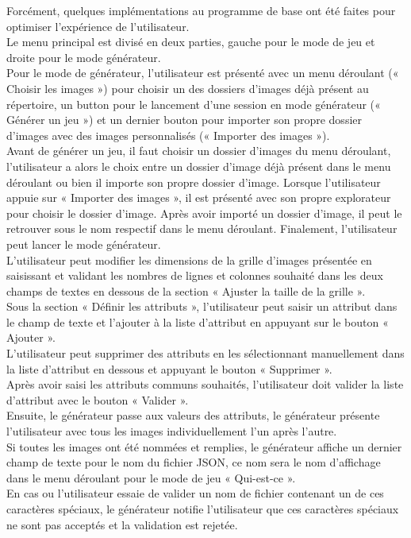 \documentclass[a4paper]{article}
\begin{document}
Forcément, quelques implémentations au programme de base ont été faites pour optimiser l’expérience de l’utilisateur.\\
Le menu principal est divisé en deux parties, gauche pour le mode de jeu et droite pour le mode générateur.\\
Pour le mode de générateur, l’utilisateur est présenté avec un menu déroulant (« Choisir les images ») pour choisir un des dossiers d’images déjà présent au répertoire, un button pour le lancement d’une session en mode générateur (« Générer un jeu ») et un dernier bouton pour importer son propre dossier d’images avec des images personnalisés (« Importer des images »).\\
Avant de générer un jeu, il faut choisir un dossier d’images du menu déroulant, l’utilisateur a alors le choix entre un dossier d’image déjà présent dans le menu déroulant ou bien il importe son propre dossier d’image. Lorsque l’utilisateur appuie sur « Importer des images », il est présenté avec son propre explorateur pour choisir le dossier d’image. Après avoir importé un dossier d’image, il peut le retrouver sous le nom respectif dans le menu déroulant. Finalement, l'utilisateur peut lancer le mode générateur.\\
L’utilisateur peut modifier les dimensions de la grille d’images présentée en saisissant et validant les nombres de lignes et colonnes souhaité dans les deux champs de textes en dessous de la section « Ajuster la taille de la grille ».\\
Sous la section « Définir les attributs », l’utilisateur peut saisir un attribut dans le champ de texte et l’ajouter à la liste d’attribut en appuyant sur le bouton « Ajouter ».\\
L’utilisateur peut supprimer des attributs en les sélectionnant manuellement dans la liste d’attribut en dessous et appuyant le bouton « Supprimer ».\\
Après avoir saisi les attributs communs souhaités, l’utilisateur doit valider la liste d’attribut avec le bouton « Valider ».\\
Ensuite, le générateur passe aux valeurs des attributs, le générateur présente l’utilisateur avec tous les images individuellement l’un après l’autre.\\
Si toutes les images ont été nommées et remplies, le générateur affiche un dernier champ de texte pour le nom du fichier JSON, ce nom sera le nom d’affichage dans le menu déroulant pour le mode de jeu « Qui-est-ce ».\\
En cas ou l’utilisateur essaie de valider un nom de fichier contenant un de ces caractères spéciaux, le générateur notifie l’utilisateur que ces caractères spéciaux ne sont pas acceptés et la validation est rejetée.\\
\end{document}
